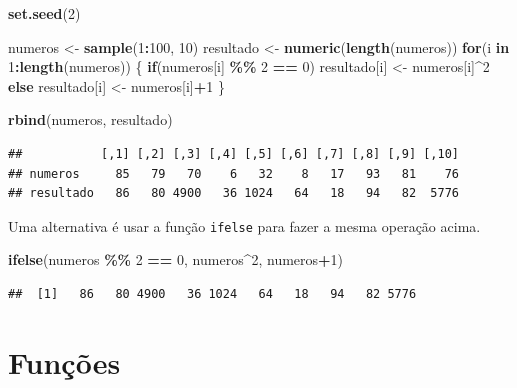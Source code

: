 \documentclass[
]{book}
\newenvironment{Shaded}{\begin{snugshade}}{\end{snugshade}}
\newcommand{\ControlFlowTok}[1]{\textcolor[rgb]{0.13,0.29,0.53}{\textbf{#1}}}
\newcommand{\DecValTok}[1]{\textcolor[rgb]{0.00,0.00,0.81}{#1}}
\newcommand{\FunctionTok}[1]{\textcolor[rgb]{0.13,0.29,0.53}{\textbf{#1}}}
\newcommand{\NormalTok}[1]{#1}
\newcommand{\OtherTok}[1]{\textcolor[rgb]{0.56,0.35,0.01}{#1}}
\newcommand{\SpecialCharTok}[1]{\textcolor[rgb]{0.81,0.36,0.00}{\textbf{#1}}}
\begin{document}
\begin{Shaded}
\begin{Highlighting}[]
\FunctionTok{set.seed}\NormalTok{(}\DecValTok{2}\NormalTok{)}

\NormalTok{numeros }\OtherTok{\textless{}{-}} \FunctionTok{sample}\NormalTok{(}\DecValTok{1}\SpecialCharTok{:}\DecValTok{100}\NormalTok{, }\DecValTok{10}\NormalTok{)}
\NormalTok{resultado }\OtherTok{\textless{}{-}} \FunctionTok{numeric}\NormalTok{(}\FunctionTok{length}\NormalTok{(numeros))}
\ControlFlowTok{for}\NormalTok{(i }\ControlFlowTok{in} \DecValTok{1}\SpecialCharTok{:}\FunctionTok{length}\NormalTok{(numeros)) \{}
  \ControlFlowTok{if}\NormalTok{(numeros[i] }\SpecialCharTok{\%\%} \DecValTok{2} \SpecialCharTok{==} \DecValTok{0}\NormalTok{)}
\NormalTok{    resultado[i] }\OtherTok{\textless{}{-}}\NormalTok{ numeros[i]}\SpecialCharTok{\^{}}\DecValTok{2}
  \ControlFlowTok{else}
\NormalTok{    resultado[i] }\OtherTok{\textless{}{-}}\NormalTok{ numeros[i]}\SpecialCharTok{+}\DecValTok{1}
\NormalTok{\}}

\FunctionTok{rbind}\NormalTok{(numeros, resultado)}
\end{Highlighting}
\end{Shaded}

\begin{verbatim}
##           [,1] [,2] [,3] [,4] [,5] [,6] [,7] [,8] [,9] [,10]
## numeros     85   79   70    6   32    8   17   93   81    76
## resultado   86   80 4900   36 1024   64   18   94   82  5776
\end{verbatim}

Uma alternativa é usar a função \texttt{ifelse} para fazer a mesma operação acima.

\begin{Shaded}
\begin{Highlighting}[]
\FunctionTok{ifelse}\NormalTok{(numeros }\SpecialCharTok{\%\%} \DecValTok{2} \SpecialCharTok{==} \DecValTok{0}\NormalTok{, numeros}\SpecialCharTok{\^{}}\DecValTok{2}\NormalTok{, numeros}\SpecialCharTok{+}\DecValTok{1}\NormalTok{)}
\end{Highlighting}
\end{Shaded}

\begin{verbatim}
##  [1]   86   80 4900   36 1024   64   18   94   82 5776
\end{verbatim}

\section{Funções}\label{funuxe7uxf5es}
\end{document}
